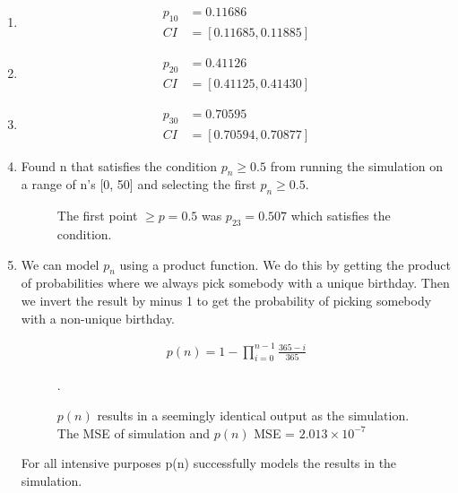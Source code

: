 \documentclass[twocolumn]{article}
\begin{document}
\begin{enumerate}[label=\alph*)]
    
\item \begin{align*}
p_{10} &= 0.11686 \\
CI &= [0.11685, 0.11885]
\end{align*}
    
\item \begin{align*}
p_{20} &=  0.41126 \\
CI &= [0.41125, 0.41430]
\end{align*}

\item \begin{align*}
p_{30} &= 0.70595 \\
CI &= [0.70594, 0.70877]
\end{align*}

\item 
Found n that satisfies the condition $p_n \ge 0.5$ from running the simulation on a range of n's [0, 50] and selecting the first $p_n \ge 0.5$.
	
\begin{figure}[H]
    \centering
    \caption{The first point $\geq p=0.5$ was $p_{23}=0.507$ which satisfies the condition.}
\end{figure}

\pagebreak

\item 
We can model $p_n$ using a product function. We do this by getting the product of probabilities where we always pick somebody with a unique birthday. Then we invert the result by minus 1 to get the probability of picking somebody with a non-unique birthday.

\begin{align*}
p(n) = 1 - \prod_{i=0}^{n-1} \frac{\text{365} - i}{365}
\end{align*}

\begin{figure}[H]
    \centering
    \caption{$p(n)$ results in a seemingly identical output as the simulation. The MSE of simulation and $p(n)$ MSE = $2.013\times10^{-7}$ }.
\end{figure}

For all intensive purposes p(n) successfully models the results in the simulation.

\end{enumerate}
\end{document}
